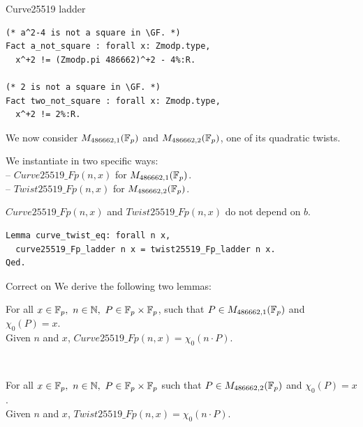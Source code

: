 \documentclass[8pt,aspectratio=169]{beamer}
\begin{document}
%
%
\begin{frame}[fragile]{Curve25519 ladder}
\begin{lstlisting}[language=Coq, basicstyle=\normalsize]
(* a^2-4 is not a square in \GF. *)
Fact a_not_square : forall x: Zmodp.type,
  x^+2 != (Zmodp.pi 486662)^+2 - 4%:R.

(* 2 is not a square in \GF. *)
Fact two_not_square : forall x: Zmodp.type,
  x^+2 != 2%:R.
\end{lstlisting}

We now consider $M_{486662,1}(\mathbb{F}_{p})$ and $M_{486662,2}(\mathbb{F}_{p})$, one of its quadratic twists.

\begin{dfn}
We instantiate  in two specific ways:\\
-- $Curve25519\_Fp(n,x)$ for $M_{486662,1}(\mathbb{F}_{p})$.\\
-- $Twist25519\_Fp(n,x)$ for $M_{486662,2}(\mathbb{F}_{p})$.
\end{dfn}

$Curve25519\_Fp(n,x)$ and $Twist25519\_Fp(n,x)$ do not depend on $b$.
\begin{lstlisting}[language=Coq, basicstyle=\normalsize]
Lemma curve_twist_eq: forall n x,
  curve25519_Fp_ladder n x = twist25519_Fp_ladder n x.
Qed.
\end{lstlisting}
\end{frame}


%
%
\begin{frame}[fragile]{Correct on }
We derive the following two lemmas:
  \begin{lemma}
  For all $x \in \mathbb{F}_{p},\ n \in \mathbb{N},\ P \in \mathbb{F}_{p} \times \mathbb{F}_{p}$,
  such that $P \in M_{486662,1}(\mathbb{F}_{p})$ and $\chi_0(P) = x$.\\
  Given $n$ and $x$, $Curve25519\_Fp(n,x) = \chi_0(n \cdot P)$.
  \end{lemma}
  ~\\

  \begin{lemma}
  For all $x \in \mathbb{F}_{p},\ n \in \mathbb{N},\ P \in \mathbb{F}_{p} \times \mathbb{F}_{p}$
  such that $P \in M_{486662,2}(\mathbb{F}_{p})$ and $\chi_0(P) = x$.\\
  Given $n$ and $x$, $Twist25519\_Fp(n,x) = \chi_0(n \cdot P)$.
  \end{lemma}
\end{frame}
\end{document}
